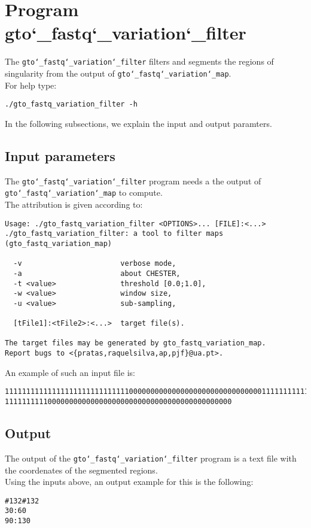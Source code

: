 \section{Program gto\char`_fastq\char`_variation\char`_filter}
The \texttt{gto\char`_fastq\char`_variation\char`_filter} filters and segments the regions of singularity from the output of \texttt{gto\char`_fastq\char`_variation\char`_map}.\\
For help type:
\begin{lstlisting}
./gto_fastq_variation_filter -h
\end{lstlisting}
In the following subsections, we explain the input and output paramters.

\subsection*{Input parameters}

The \texttt{gto\char`_fastq\char`_variation\char`_filter} program needs a the output of \texttt{gto\char`_fastq\char`_variation\char`_map} to compute.\\
The attribution is given according to:
\begin{lstlisting}
Usage: ./gto_fastq_variation_filter <OPTIONS>... [FILE]:<...>      
./gto_fastq_variation_filter: a tool to filter maps (gto_fastq_variation_map)  
                                                     
  -v                       verbose mode,             
  -a                       about CHESTER,            
  -t <value>               threshold [0.0;1.0],      
  -w <value>               window size,              
  -u <value>               sub-sampling,             
                                                     
  [tFile1]:<tFile2>:<...>  target file(s).           
                                                     
The target files may be generated by gto_fastq_variation_map.    
Report bugs to <{pratas,raquelsilva,ap,pjf}@ua.pt>. 
\end{lstlisting}
An example of such an input file is:
\begin{lstlisting}
1111111111111111111111111111100000000000000000000000000000001111111111111111111
11111111110000000000000000000000000000000000000000000
\end{lstlisting}

\subsection*{Output}
The output of the \texttt{gto\char`_fastq\char`_variation\char`_filter} program is a text file with the coordenates of the segmented regions.\\
Using the inputs above, an output example for this is the following:
\begin{lstlisting}
#132#132
30:60
90:130
\end{lstlisting}